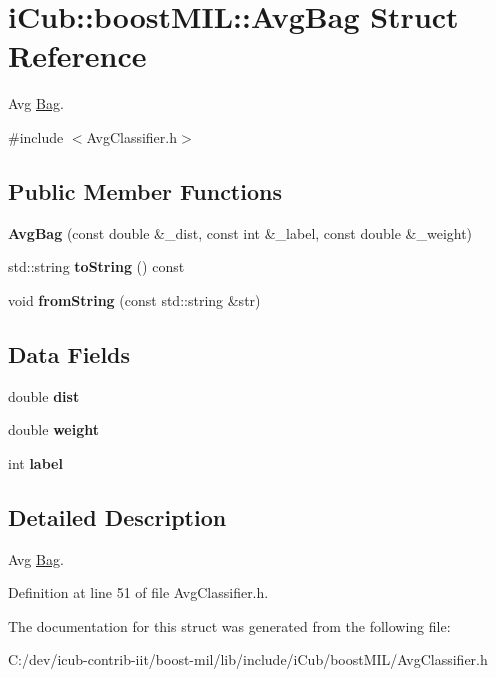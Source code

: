\section{i\+Cub\+:\+:boost\+M\+I\+L\+:\+:Avg\+Bag Struct Reference}
\label{structiCub_1_1boostMIL_1_1AvgBag}


Avg \hyperlink{structiCub_1_1boostMIL_1_1Bag}{Bag}.  




{\ttfamily \#include $<$Avg\+Classifier.\+h$>$}

\subsection*{Public Member Functions}
\begin{DoxyCompactItemize}
\item 
{\bfseries Avg\+Bag} (const double \&\+\_\+dist, const int \&\+\_\+label, const double \&\+\_\+weight)\label{structiCub_1_1boostMIL_1_1AvgBag_a3f4dc7da03c57bddf5e79309975b2bb1}

\item 
std\+::string {\bfseries to\+String} () const \label{structiCub_1_1boostMIL_1_1AvgBag_a989eeb943b559c092d217469ba5b0d45}

\item 
void {\bfseries from\+String} (const std\+::string \&str)\label{structiCub_1_1boostMIL_1_1AvgBag_a8f0c69f5dd1543ac9a641d8df7b2141c}

\end{DoxyCompactItemize}
\subsection*{Data Fields}
\begin{DoxyCompactItemize}
\item 
double {\bfseries dist}\label{structiCub_1_1boostMIL_1_1AvgBag_a87872862058b47a30d6f47542cd42dd3}

\item 
double {\bfseries weight}\label{structiCub_1_1boostMIL_1_1AvgBag_a6bb6eec76b84f353a106071658da8768}

\item 
int {\bfseries label}\label{structiCub_1_1boostMIL_1_1AvgBag_aa75956ad68627c16ce70bbc2f43d00e7}

\end{DoxyCompactItemize}


\subsection{Detailed Description}
Avg \hyperlink{structiCub_1_1boostMIL_1_1Bag}{Bag}. 

Definition at line 51 of file Avg\+Classifier.\+h.



The documentation for this struct was generated from the following file\+:\begin{DoxyCompactItemize}
\item 
C\+:/dev/icub-\/contrib-\/iit/boost-\/mil/lib/include/i\+Cub/boost\+M\+I\+L/Avg\+Classifier.\+h\end{DoxyCompactItemize}
